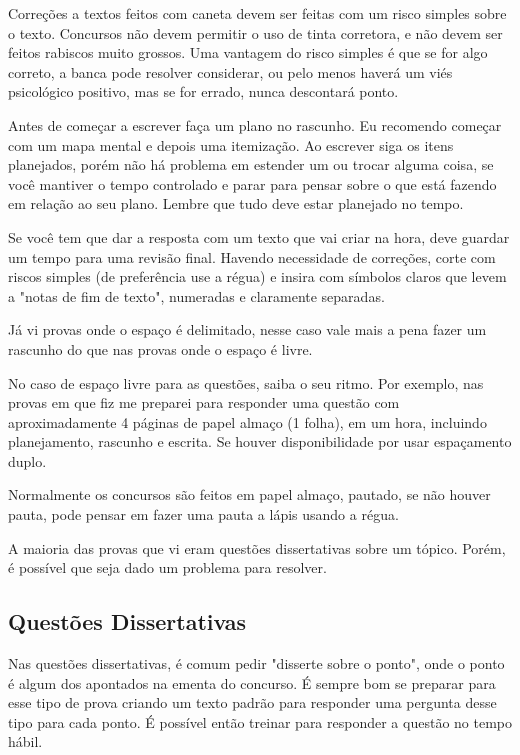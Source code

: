 \documentclass{article}
\begin{document}
Correções a textos feitos com caneta devem ser feitas com um risco simples sobre o texto. Concursos não devem permitir o uso de tinta corretora, e não devem ser feitos rabiscos muito grossos. Uma vantagem do risco simples é que se for algo correto, a banca pode resolver considerar, ou pelo menos haverá um viés psicológico positivo, mas se for errado, nunca descontará ponto.

Antes de começar a escrever faça um plano no rascunho. Eu recomendo começar com um mapa mental e depois uma itemização. Ao escrever siga os itens planejados, porém não há problema em estender um ou trocar alguma coisa, se você mantiver o tempo controlado e parar para pensar sobre o que está fazendo em relação ao seu plano. Lembre que tudo deve estar planejado no tempo.

Se você tem que dar a resposta com um texto que vai criar na hora, deve guardar um tempo para uma revisão final. Havendo necessidade de correções, corte com riscos simples (de preferência use a régua) e insira com símbolos claros que levem a "notas de fim de texto", numeradas e claramente separadas.

Já vi provas onde o espaço é delimitado, nesse caso vale mais a  pena fazer um rascunho do que nas provas onde o espaço é livre.

No caso de espaço livre para as questões, saiba o seu ritmo. Por exemplo, nas provas em que fiz me preparei para responder uma questão com aproximadamente 4 páginas de papel almaço (1 folha), em um hora, incluindo planejamento, rascunho e escrita. Se houver disponibilidade por usar espaçamento duplo.

Normalmente os concursos são feitos em papel almaço, pautado, se não houver pauta, pode pensar em fazer uma pauta a lápis usando a régua.

A maioria das provas que vi eram questões dissertativas sobre um tópico. Porém, é possível que seja dado um problema para resolver.

\subsection{Questões Dissertativas}

Nas questões dissertativas, é comum pedir "disserte sobre o ponto", onde o ponto é algum dos apontados na ementa do concurso. 
É sempre bom se preparar para esse tipo de prova criando um texto padrão para responder uma pergunta desse tipo para cada ponto. 
É possível então treinar para responder a questão no tempo hábil.
\end{document}
